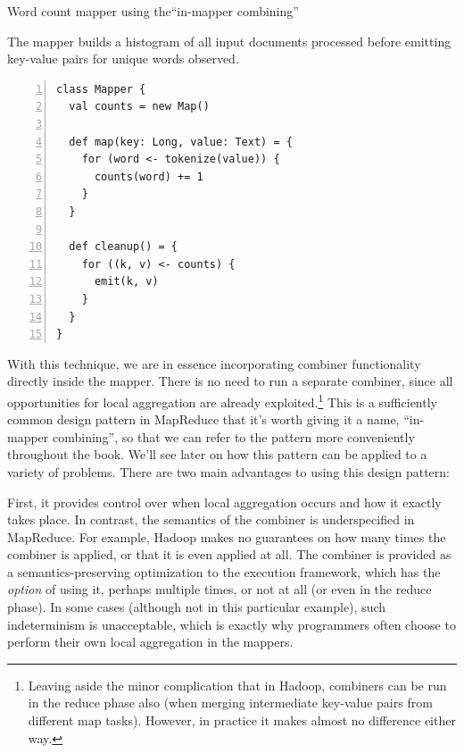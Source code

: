 \begin{algorithm}[t]
\caption{Word count mapper using the``in-mapper combining''}
\label{algorithm:chapter3:word-count:outer-hash}
The mapper builds a histogram of all input documents processed before
emitting key-value pairs for unique words observed.
\begin{small}
\begin{Verbatim}[numbers=left, xleftmargin=7.5mm]
class Mapper {
  val counts = new Map()

  def map(key: Long, value: Text) = {
    for (word <- tokenize(value)) {
      counts(word) += 1
    }
  }

  def cleanup() = {
    for ((k, v) <- counts) {
      emit(k, v)
    }
  }
}
\end{Verbatim}
\end{small}
\end{algorithm}

With this technique, we are in essence incorporating combiner
functionality directly inside the mapper.  There is no need to run a
separate combiner, since all opportunities for local aggregation are
already exploited.\footnote{Leaving aside the minor complication that
  in Hadoop, combiners can be run in the reduce phase also (when
  merging intermediate key-value pairs from different map tasks).
  However, in practice it makes almost no difference either way.} This
is a sufficiently common design pattern in MapReduce that it's worth
giving it a name, ``in-mapper combining'', so that we can refer to the
pattern more conveniently throughout the book.  We'll see later on how
this pattern can be applied to a variety of problems.  There are two
main advantages to using this design pattern:

First, it provides control over when local aggregation occurs and how
it exactly takes place.  In contrast, the semantics of the combiner is
underspecified in MapReduce.  For example, Hadoop makes no guarantees
on how many times the combiner is applied, or that it is even applied
at all.  The combiner is provided as a semantics-preserving
optimization to the execution framework, which has the \emph{option} of
using it, perhaps multiple times, or not at all (or even in the reduce
phase).  In some cases (although not in this particular example), such
indeterminism is unacceptable, which is exactly why programmers often
choose to perform their own local aggregation in the mappers.

